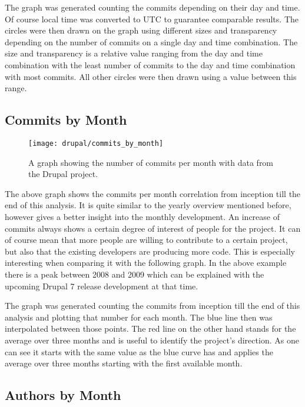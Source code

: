 The graph was generated counting the commits depending on their day and time.
Of course local time was converted to \ac{UTC} to guarantee comparable results.
The circles were then drawn on the graph using different sizes and transparency
depending on the number of commits on a single day and time combination. The
size and transparency is a relative value ranging from the day and time
combination with the least number of commits to the day and time combination
with most commits. All other circles were then drawn using a value between this
range.


\subsection{Commits by Month} %

\begin{figure}[h!t]
  \centering
  \texttt{[image: drupal/commits\_by\_month]}
  \caption[The Commits by Month Graph]
  {A graph showing the number of commits per month with data from the Drupal
    project.}
\end{figure}

The above graph shows the commits per month correlation from inception till the
end of this analysis. It is quite similar to the yearly overview mentioned
before, however gives a better insight into the monthly development. An
increase of commits always shows a certain degree of interest of people for the
project. It can of course mean that more people are willing to contribute to a
certain project, but also that the existing developers are producing more code.
This is especially interesting when comparing it with the following graph. In
the above example there is a peak between 2008 and 2009 which can be explained
with the upcoming Drupal 7 release development at that time.

The graph was generated counting the commits from inception till the end of
this analysis and plotting that number for each month. The blue line then was
interpolated between those points. The red line on the other hand stands for
the average over three months and is useful to identify the project's
direction. As one can see it starts with the same value as the blue curve has
and applies the average over three months starting with the first available
month.


\subsection{Authors by Month} %

